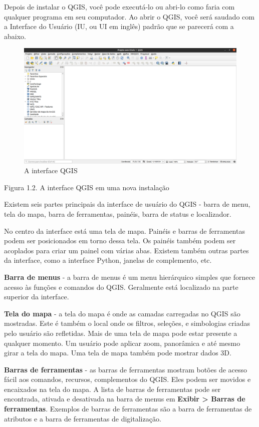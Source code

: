 \documentclass[
  portuguese,
]{krantz}
\begin{document}
Depois de instalar o QGIS, você pode executá-lo ou abri-lo como faria com qualquer programa em seu computador. Ao abrir o QGIS, você será saudado com a Interface do Usuário (IU, ou UI em inglês) padrão que se parecerá com a abaixo.

\begin{figure}
\centering
\includegraphics{media/modulo1/qgis-interface.png}
\caption{A interface QGIS}
\end{figure}

Figura 1.2. A interface QGIS em uma nova instalação

Existem seis partes principais da interface de usuário do QGIS - barra de menu, tela do mapa, barra de ferramentas, painéis, barra de status e localizador.

No centro da interface está uma tela de mapa. Painéis e barras de ferramentas podem ser posicionados em torno dessa tela. Os painéis também podem ser acoplados para criar um painel com várias abas. Existem também outras partes da interface, como a interface Python, janelas de complemento, etc.

\textbf{Barra de menus} - a barra de menus é um menu hierárquico simples que fornece acesso às funções e comandos do QGIS. Geralmente está localizado na parte superior da interface.

\textbf{Tela do mapa} - a tela do mapa é onde as camadas carregadas no QGIS são mostradas. Este é também o local onde os filtros, seleções, e simbologias criadas pelo usuário são refletidas. Mais de uma tela de mapa pode estar presente a qualquer momento. Um usuário pode aplicar zoom, panorâmica e até mesmo girar a tela do mapa. Uma tela de mapa também pode mostrar dados 3D.

\textbf{Barras de ferramentas} - as barras de ferramentas mostram botões de acesso fácil aos comandos, recursos, complementos do QGIS. Eles podem ser movidos e encaixados na tela do mapa. A lista de barras de ferramentas pode ser encontrada, ativada e desativada na barra de menus em \textbf{Exibir \textgreater{} Barras de ferramentas}. Exemplos de barras de ferramentas são a barra de ferramentas de atributos e a barra de ferramentas de digitalização.
\end{document}
